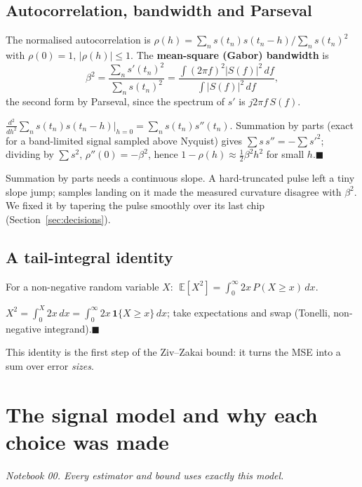 \documentclass[11pt,a4paper]{article}
\newcommand{\E}{\mathbb{E}}
\begin{document}
\subsection{Autocorrelation, bandwidth and Parseval}\label{sec:parseval}
The normalised autocorrelation is $\rho(h)=\sum_n s(t_n)s(t_n-h)\big/\sum_n s(t_n)^2$ with $\rho(0)=1$, $|\rho(h)|\le1$.
The \textbf{mean-square (Gabor) bandwidth} is
\begin{equation}
  \beta^2=\frac{\sum_n s'(t_n)^2}{\sum_n s(t_n)^2}=\frac{\int(2\pi f)^2|S(f)|^2\,df}{\int|S(f)|^2\,df},
\end{equation}
the second form by Parseval, since the spectrum of $s'$ is $j2\pi f\,S(f)$.
\begin{proofbox}[Fact: $\rho''(0)=-\beta^2$]
$\frac{d^2}{dh^2}\sum_n s(t_n)s(t_n-h)\big|_{h=0}=\sum_n s(t_n)s''(t_n)$. Summation by parts (exact for a band-limited signal
sampled above Nyquist) gives $\sum s\,s''=-\sum s'^2$; dividing by $\sum s^2$, $\rho''(0)=-\beta^2$, hence
$1-\rho(h)\approx\tfrac12\beta^2h^2$ for small $h$.\hfill$\blacksquare$
\end{proofbox}
\begin{warnbox}
Summation by parts needs a continuous slope. A hard-truncated pulse left a tiny slope jump; samples landing on it made the
measured curvature disagree with $\beta^2$. We fixed it by tapering the pulse smoothly over its last chip
(Section~\ref{sec:decisions}).
\end{warnbox}

\subsection{A tail-integral identity}\label{sec:tail}
For a non-negative random variable $X$: $\;\E[X^2]=\int_0^\infty 2x\,P(X\ge x)\,dx.$
\begin{proofbox}
$X^2=\int_0^X2x\,dx=\int_0^\infty 2x\,\mathbf 1\{X\ge x\}\,dx$; take expectations and swap (Tonelli, non-negative integrand).\hfill$\blacksquare$
\end{proofbox}
This identity is the first step of the Ziv--Zakai bound: it turns the MSE into a sum over error \emph{sizes}.

\section{The signal model and why each choice was made}\label{sec:model}
\textit{Notebook 00. Every estimator and bound uses exactly this model.}
\end{document}
